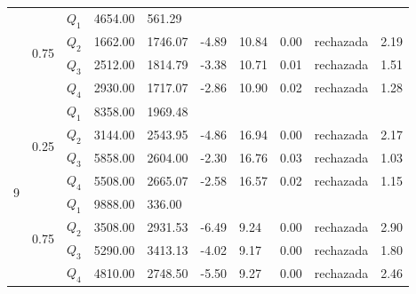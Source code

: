 \begin{table}[]
\begin{tabular}{|l|l|l|l|l|l|l|l|l|l|}
 & \multirow{4}{*}{0.75} & $Q_1$ & 4654.00 & 561.29 & \multicolumn{5}{l|}{} \\ \cline{3-10} 
 &  & $Q_2$ & 1662.00 & 1746.07 & -4.89 & 10.84 & 0.00 & rechazada & 2.19 \\ \cline{3-10} 
 &  & $Q_3$ & 2512.00 & 1814.79 & -3.38 & 10.71 & 0.01 & rechazada & 1.51 \\ \cline{3-10} 
 &  & $Q_4$ & 2930.00 & 1717.07 & -2.86 & 10.90 & 0.02 & rechazada & 1.28 \\ \hline
\multirow{8}{*}{9} & \multirow{4}{*}{0.25} & $Q_1$ & 8358.00 & 1969.48 & \multicolumn{5}{l|}{} \\ \cline{3-10} 
 &  & $Q_2$ & 3144.00 & 2543.95 & -4.86 & 16.94 & 0.00 & rechazada & 2.17 \\ \cline{3-10} 
 &  & $Q_3$ & 5858.00 & 2604.00 & -2.30 & 16.76 & 0.03 & rechazada & 1.03 \\ \cline{3-10} 
 &  & $Q_4$ & 5508.00 & 2665.07 & -2.58 & 16.57 & 0.02 & rechazada & 1.15 \\ \cline{2-10} 
 & \multirow{4}{*}{0.75} & $Q_1$ & 9888.00 & 336.00 & \multicolumn{5}{l|}{} \\ \cline{3-10} 
 &  & $Q_2$ & 3508.00 & 2931.53 & -6.49 & 9.24 & 0.00 & rechazada & 2.90 \\ \cline{3-10} 
 &  & $Q_3$ & 5290.00 & 3413.13 & -4.02 & 9.17 & 0.00 & rechazada & 1.80 \\ \cline{3-10} 
 &  & $Q_4$ & 4810.00 & 2748.50 & -5.50 & 9.27 & 0.00 & rechazada & 2.46 \\ \hline
\end{tabular}
\end{table}

